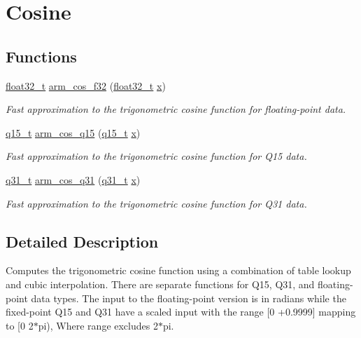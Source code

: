 \hypertarget{group__cos}{\section{Cosine}
\label{group__cos}
}
\subsection*{Functions}
\begin{DoxyCompactItemize}
\item 
\hyperlink{arm__math_8h_a4611b605e45ab401f02cab15c5e38715}{float32\-\_\-t} \hyperlink{group__cos_gace15287f9c64b9b4084d1c797d4c49d8}{arm\-\_\-cos\-\_\-f32} (\hyperlink{arm__math_8h_a4611b605e45ab401f02cab15c5e38715}{float32\-\_\-t} \hyperlink{pios__opahrs__proto_8h_ad0da36b2558901e21e7a30f6c227a45e}{x})
\begin{DoxyCompactList}\small\item\em Fast approximation to the trigonometric cosine function for floating-\/point data. \end{DoxyCompactList}\item 
\hyperlink{arm__math_8h_ab5a8fb21a5b3b983d5f54f31614052ea}{q15\-\_\-t} \hyperlink{group__cos_gadfd60c24def501638c0d5db20f4c869b}{arm\-\_\-cos\-\_\-q15} (\hyperlink{arm__math_8h_ab5a8fb21a5b3b983d5f54f31614052ea}{q15\-\_\-t} \hyperlink{pios__opahrs__proto_8h_ad0da36b2558901e21e7a30f6c227a45e}{x})
\begin{DoxyCompactList}\small\item\em Fast approximation to the trigonometric cosine function for Q15 data. \end{DoxyCompactList}\item 
\hyperlink{arm__math_8h_adc89a3547f5324b7b3b95adec3806bc0}{q31\-\_\-t} \hyperlink{group__cos_gad80f121949ef885a77d83ab36e002567}{arm\-\_\-cos\-\_\-q31} (\hyperlink{arm__math_8h_adc89a3547f5324b7b3b95adec3806bc0}{q31\-\_\-t} \hyperlink{pios__opahrs__proto_8h_ad0da36b2558901e21e7a30f6c227a45e}{x})
\begin{DoxyCompactList}\small\item\em Fast approximation to the trigonometric cosine function for Q31 data. \end{DoxyCompactList}\end{DoxyCompactItemize}


\subsection{Detailed Description}
Computes the trigonometric cosine function using a combination of table lookup and cubic interpolation. There are separate functions for Q15, Q31, and floating-\/point data types. The input to the floating-\/point version is in radians while the fixed-\/point Q15 and Q31 have a scaled input with the range \mbox{[}0 +0.9999\mbox{]} mapping to \mbox{[}0 2$\ast$pi), Where range excludes 2$\ast$pi.

